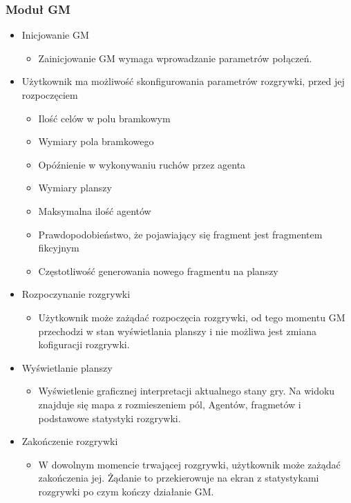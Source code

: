 \documentclass[../Dokumentacja.tex]{subfiles}
\begin{document}
\subsubsection{Moduł GM}
\begin{itemize}
	\item Inicjowanie GM
	\begin{itemize}
		\item Zainicjowanie GM wymaga wprowadzanie parametrów połączeń.
	\end{itemize}
	\item Użytkownik ma możliwość skonfigurowania parametrów rozgrywki, przed jej rozpoczęciem
	\begin{itemize}
		\item Ilość celów w polu bramkowym
		\item Wymiary pola bramkowego
		\item Opóźnienie w wykonywaniu ruchów przez agenta
		\item Wymiary planszy
		\item Maksymalna ilość agentów
		\item Prawdopodobieństwo, że pojawiający się fragment jest fragmentem fikcyjnym
		\item Częstotliwość generowania nowego fragmentu na planszy
	\end{itemize}
	\item Rozpoczynanie rozgrywki
	\begin{itemize}
		\item Użytkownik może zażądać rozpoczęcia rozgrywki, od tego momentu GM przechodzi w stan wyświetlania planszy i nie możliwa jest zmiana kofiguracji rozgrywki.
	\end{itemize}
	\item Wyświetlanie planszy
	\begin{itemize}
		\item Wyświetlenie graficznej interpretacji aktualnego stany gry. Na widoku znajduje się mapa z rozmieszeniem pól, Agentów, fragmetów i podstawowe statystyki rozgrywki.
	\end{itemize}
	\item Zakończenie rozgrywki
	\begin{itemize}
		\item W dowolnym momencie trwającej rozgrywki, użytkownik może zażądać zakończenia jej. Żądanie to przekierowuje na ekran z statystykami rozgrywki po czym kończy działanie GM.
	\end{itemize}
\end{itemize}
\end{document}
